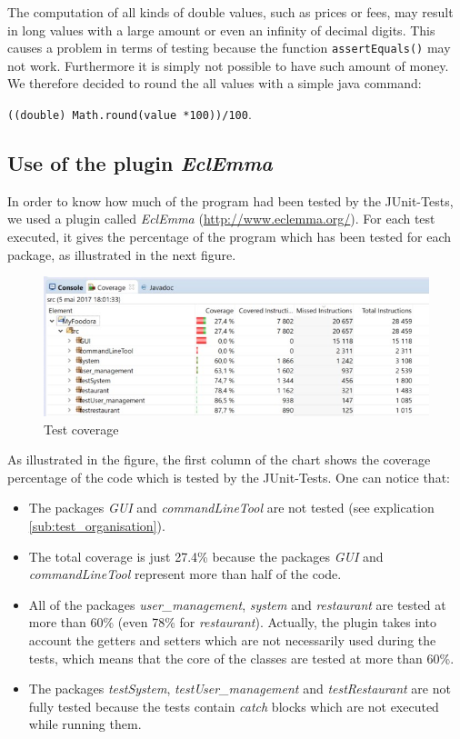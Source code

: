 The computation of all kinds of double values, such as prices or fees, may result in long 
values with a large amount or even an infinity of decimal digits. This causes a problem in 
terms of testing because the function \lstinline|assertEquals()| may not work. Furthermore 
it is simply not possible to have such amount of money. We therefore decided to round the 
all values with a simple java command:

\lstinline|((double) Math.round(value *100))/100|.

\subsection{Use of the plugin \textit{EclEmma}}
\label{sub:use_of_the_plugin_EclEmma}

In order to know how much of the program had been tested by the JUnit-Tests, we used a plugin called \textit{EclEmma} (\url{http://www.eclemma.org/}). For each test executed, it gives the percentage of the program which has been tested for each package, as illustrated in the next figure. 
\begin{figure}[H]
	\centering
	\includegraphics[width=1\linewidth]{./ima/testcoverage.jpg}
	\caption{Test coverage}
	\label{fig:test-coverage}
\end{figure}
As illustrated in the figure, the first column of the chart shows the coverage percentage of the code which is tested by the JUnit-Tests. One can notice that:
\begin{itemize}
	\item{} The packages \textit{GUI} and \textit{commandLineTool} are not tested (see explication \ref{sub:test_organisation}).
	\item{} The total coverage is just 27.4\% because the packages \textit{GUI} and \textit{commandLineTool}  represent more than half of the code.
	\item{} All of the packages \textit{user\_management}, \textit{system} and \textit{restaurant} are tested at more than 60\% (even 78\% for \textit{restaurant}). Actually, the plugin takes into account the getters and setters which are not necessarily used during the tests, which means that the core of the classes are tested at more than 60\%.
	\item{} The packages \textit{testSystem}, \textit{testUser\_management} and \textit{testRestaurant} are not fully tested because the tests contain \textit{catch} blocks which are not executed while running them.
\end{itemize}
